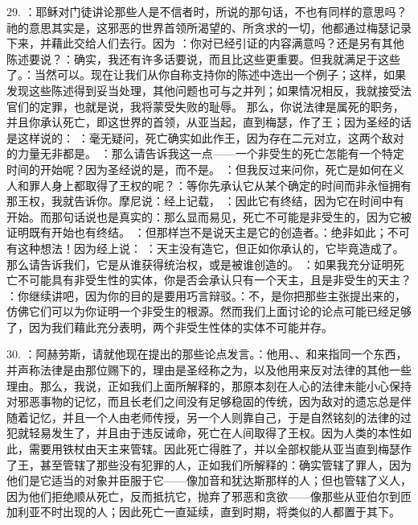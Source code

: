 29. ：耶稣对门徒讲论那些人是不信者时，所说的那句话，不也有同样的意思吗？祂的意思其实是，这邪恶的世界首领所渴望的、所贪求的一切，他都通过梅瑟记录下来，并藉此交给人们去行。因为 ：你对已经引证的内容满意吗？还是另有其他陈述要说？：确实，我还有许多话要说，而且比这些更重要。但我就满足于这些了。：当然可以。现在让我们从你自称支持你的陈述中选出一个例子；这样，如果发现这些陈述得到妥当处理，其他问题也可与之并列；如果情况相反，我就接受法官们的定罪，也就是说，我将蒙受失败的耻辱。 那么，你说法律是属死的职务，并且你承认死亡，即这世界的首领，从亚当起，直到梅瑟，作了王；因为圣经的话是这样说的： ：毫无疑问，死亡确实如此作王，因为存在二元对立，这两个敌对的力量无非都是。 ：那么请告诉我这一点——一个非受生的死亡怎能有一个特定时间的开始呢？因为圣经说的是，而不是。 ：但我反过来问你，死亡是如何在义人和罪人身上都取得了王权的呢？：等你先承认它从某个确定的时间而非永恒拥有那王权，我就告诉你。摩尼说：经上记载， ：因此它有终结，因为它在时间中有开始。而那句话说也是真实的：那么显而易见，死亡不可能是非受生的，因为它被证明既有开始也有终结。 ：但那样岂不是说天主是它的创造者。：绝非如此；不可有这种想法！因为经上说： ：天主没有造它，但正如你承认的，它毕竟造成了。那么请告诉我们，它是从谁获得统治权，或是被谁创造的。 ：如果我充分证明死亡不可能具有非受生性的实体，你是否会承认只有一个天主，且是非受生的天主？ ：你继续讲吧，因为你的目的是要用巧言辩驳。：不，是你把那些主张提出来的，仿佛它们可以为你证明一个非受生的根源。然而我们上面讨论的论点可能已经足够了，因为我们藉此充分表明，两个非受生性体的实体不可能并存。\par

30. ：阿赫劳斯，请就他现在提出的那些论点发言。：他用、、和来指同一个东西，并声称法律是由那位赐下的，理由是圣经称之为，以及他用来反对法律的其他一些理由。那么，我说，正如我们上面所解释的，那原本刻在人心的法律未能小心保持对邪恶事物的记忆，而且长老们之间没有足够稳固的传统，因为敌对的遗忘总是伴随着记忆，并且一个人由老师传授，另一个人则靠自己，于是自然铭刻的法律的过犯就轻易发生了，并且由于违反诫命，死亡在人间取得了王权。因为人类的本性如此，需要用铁杖由天主来管辖。因此死亡得胜了，并以全部权能从亚当直到梅瑟作了王，甚至管辖了那些没有犯罪的人，正如我们所解释的：确实管辖了罪人，因为他们是它适当的对象并臣服于它——像加音和犹达斯那样的人；但也管辖了义人，因为他们拒绝顺从死亡，反而抵抗它，抛弃了邪恶和贪欲——像那些从亚伯尔到匝加利亚不时出现的人；因此死亡一直延续，直到时期，将类似的人都置于其下。\par

